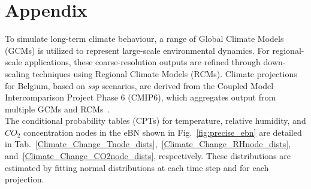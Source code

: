 \section{Appendix}\label{appendixA}

To simulate long-term climate behaviour, a range of Global Climate Models (GCMs) is utilized to represent large-scale environmental dynamics. For regional-scale applications, these coarse-resolution outputs are refined through down-scaling techniques using Regional Climate Models (RCMs). Climate projections for Belgium, based on \textit{ssp} scenarios, are derived from the Coupled Model Intercomparison Project Phase 6 (CMIP6), which aggregates output from multiple GCMs and RCMs~\cite{CMIP6,Copernicus_Climate_Change}.\\
The conditional probability tables (CPTs) for temperature, relative humidity, and $CO_2$ concentration nodes in the eBN shown in Fig.~\ref{fig:precise_ebn} are detailed in Tab.~\ref{Climate_Change_Tnode_dists},~\ref{Climate_Change_RHnode_dists}, and~\ref{Climate_Change_CO2node_dists}, respectively. These distributions are estimated by fitting normal distributions at each time step and for each projection.

